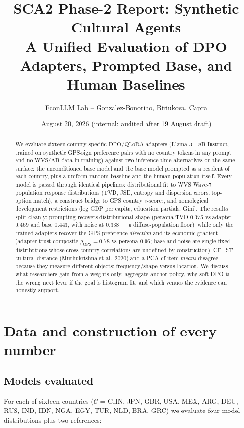 \documentclass[11pt]{article}
\title{\textbf{SCA2 Phase-2 Report: Synthetic Cultural Agents \\ A Unified Evaluation of DPO Adapters, Prompted Base, and Human Baselines}}
\author{EconLLM Lab -- Gonzalez-Bonorino, Biriukova, Capra}
\date{August 20, 2026 (internal; audited after 19 August draft)}
\begin{document}
\maketitle

\begin{abstract}
\noindent We evaluate sixteen country-specific DPO/QLoRA adapters (Llama-3.1-8B-Instruct, trained on synthetic GPS-sign preference pairs with no country tokens in any prompt and no WVS/AB data in training) against two inference-time alternatives on the same surface: the unconditioned base model and the base model prompted as a resident of each country, plus a uniform random baseline and the human population itself. Every model is passed through identical pipelines: distributional fit to WVS Wave-7 population response distributions (TVD, JSD, entropy and dispersion errors, top-option match), a construct bridge to GPS country $z$-scores, and nomological development restrictions (log GDP per capita, education partials, Gini). The results split cleanly: prompting recovers distributional shape (persona TVD 0.375 vs adapter 0.469 and base 0.443, with noise at 0.338 --- a diffuse-population floor), while only the trained adapters recover the GPS preference \emph{direction} and its economic gradient (adapter trust composite $\rho_{\mathrm{GPS}}=0.78$ vs persona 0.06; base and noise are single fixed distributions whose cross-country correlations are undefined by construction). CF\_ST cultural distance (Muthukrishna et al.\ 2020) and a PCA of item \emph{means} disagree because they measure different objects: frequency/shape versus location. We discuss what researchers gain from a weights-only, aggregate-anchor policy, why soft DPO is the wrong next lever if the goal is histogram fit, and which venues the evidence can honestly support.
\end{abstract}

\section{Data and construction of every number}\label{sec:construction}

\subsection{Models evaluated}
\label{sec:models}
For each of sixteen countries ($\mathcal{C}$ = CHN, JPN, GBR, USA, MEX, ARG, DEU, RUS, IND, IDN, NGA, EGY, TUR, NLD, BRA, GRC) we evaluate four model distributions plus two references:
\end{document}
